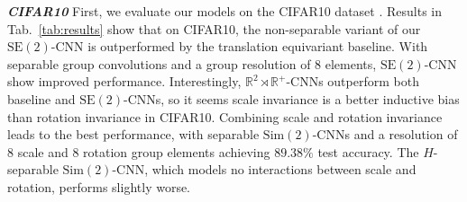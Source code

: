 \documentclass[nohyperref]{article}
\theoremstyle{plain}
\theoremstyle{definition}
\theoremstyle{remark}
\newcommand{\R}{\mathbb{R}}
\begin{document}
\textbf{\textit{CIFAR10}} First, we evaluate our models on the CIFAR10 dataset \citep{krizhevsky2009learning}. Results in Tab.~\ref{tab:results} show that on CIFAR10, the non-separable variant of our $\mathrm{SE(2)}$-CNN is outperformed by the translation equivariant baseline. With separable group convolutions and a group resolution of 8 elements, $\mathrm{SE(2)}$-CNN show improved performance. Interestingly, $\R^2 {\rtimes} \R^+$-CNNs outperform both baseline and $\mathrm{SE(2)}$-CNNs, so it seems scale invariance is a better inductive bias than rotation invariance in CIFAR10. Combining scale and rotation invariance leads to the best performance, with separable $\mathrm{Sim(2)}$-CNNs and a resolution of 8 scale and 8 rotation group elements achieving $89.38\%$ test accuracy. The $H$-separable $\mathrm{Sim(2)}$-CNN, which models no interactions between scale and rotation, performs slightly worse.
\end{document}

